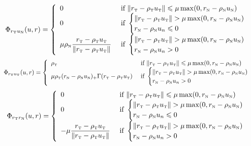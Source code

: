 \begin{equation}
  \label{eq:Phi-AC-II-rtun}
  \Phi_{r_\t u_\n}(u,r) =   
  \left\{
    \begin{array}{ll}
      0 & \text{ if }  \|r_{\t}  - \rho_{\t} u_{\t}\| \leq  \mu \max (0 ,r_{\n} - \rho_{\n} u_\n )  \\
      0 & \text{ if }
      \begin{cases}
        \|r_{\t}  - \rho_{\t} u_{\t}\| >  \mu \max (0 ,r_{\n} - \rho_{\n} u_\n )  \\
        r_{\n} - \rho_{\n} u_n\leq 0
      \end{cases} \\
     \mu \rho_{\n}  \Frac{r_{\t} - \rho_{\t} u_{\t} }{ \| r_{\t} - \rho_{\t} u_{\t}\| }   &  \text{ if }
      \begin{cases}
        \|r_{\t}  - \rho_{\t} u_{\t}\| >  \mu \max (0 ,r_{\n} - \rho_{\n} u_\n )  \\
        r_{\n} - \rho_{\n} u_n > 0
      \end{cases} \\
    \end{array}\right. 
\end{equation}
\begin{equation}
  \label{eq:Phi-AC-II-rtut}
  \Phi_{r_\t u_\t}(u,r) =   
  \left\{
    \begin{array}{ll}
      \rho_{\t} & \text{ if }  \|r_{\t}  - \rho_{\t} u_{\t}\| \leq  \mu \max (0 ,r_{\n} - \rho_{\n} u_\n )  \\
     \mu\rho_{\t}(r_{\n} - \rho_{\n} u_\n )_+ \Gamma(r_{\t} - \rho_{\t} u_{\t})  
      &  \text{ if }
      \begin{cases}
        \|r_{\t}  - \rho_{\t} u_{\t}\| >  \mu \max (0 ,r_{\n} - \rho_{\n} u_\n )  \\
        r_{\n} - \rho_{\n} u_n > 0
      \end{cases} \\
    \end{array}\right. 
\end{equation}
\begin{equation}
  \label{eq:Phi-AC-II-rtrn}
  \Phi_{r_\t r_\n}(u,r) =   
  \left\{
    \begin{array}{ll}
      0 & \text{ if }  \|r_{\t}  - \rho_{\t} u_{\t}\| \leq  \mu \max (0 ,r_{\n} - \rho_{\n} u_\n )  \\
      0 & \text{ if }
      \begin{cases}
        \|r_{\t}  - \rho_{\t} u_{\t}\| >  \mu \max (0 ,r_{\n} - \rho_{\n} u_\n )  \\
        r_{\n} - \rho_{\n} u_n\leq 0
      \end{cases} \\
       -\mu  \Frac{r_{\t} - \rho_{\t} u_{\t} }{ \| r_{\t} - \rho_{\t} u_{\t}\| }  &  \text{ if }
      \begin{cases}
        \|r_{\t}  - \rho_{\t} u_{\t}\| >  \mu \max (0 ,r_{\n} - \rho_{\n} u_\n )  \\
        r_{\n} - \rho_{\n} u_n > 0
      \end{cases} \\
    \end{array}\right. 
\end{equation}
